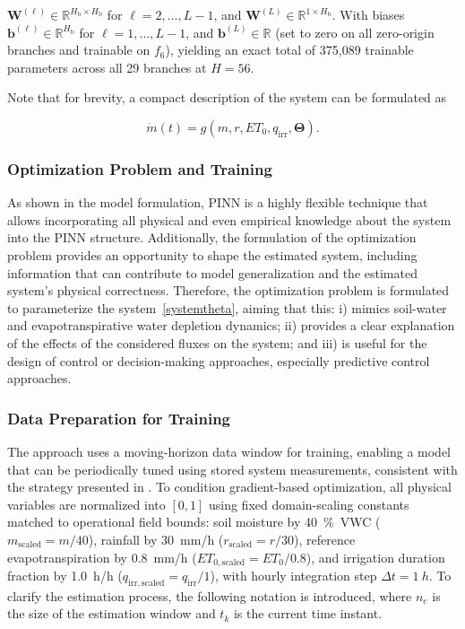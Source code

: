 \documentclass[pdflatex,sn-nature]{sn-jnl}%
\theoremstyle{thmstyleone}%
\theoremstyle{thmstyletwo}%
\theoremstyle{thmstylethree}%
\begin{document}
\( \mathbf{W}^{(\ell)} \in \mathbb{R}^{H_{\mathrm{b}} \times H_{\mathrm{b}}} \) for \( \ell = 2, \dots, L-1 \), and \( \mathbf{W}^{(L)} \in \mathbb{R}^{1 \times H_{\mathrm{b}}} \). With biases \( \mathbf{b}^{(\ell)} \in \mathbb{R}^{H_{\mathrm{b}}} \) for \( \ell = 1, \dots, L-1 \), and \( \mathbf{b}^{(L)} \in \mathbb{R} \) (set to zero on all zero-origin branches and trainable on \(f_6\)), yielding an exact total of 375,089 trainable parameters across all 29 branches at \(H=56\).

Note that for brevity, a compact description of the system can be formulated as 

\begin{equation}
    \label{systemtheta}
    \dot{m}(t) = g(m,r,ET_0,q_{\mathrm{irr}},\boldsymbol{\Theta}).
\end{equation}


\subsubsection{Optimization Problem and Training}\label{subsec2}

As shown in the model formulation, PINN is a highly flexible technique that allows incorporating all physical and even empirical knowledge about the system into the PINN structure. Additionally, the formulation of the optimization problem provides an opportunity to shape the estimated system, including information that can contribute to model generalization and the estimated system's physical correctness. Therefore, the optimization problem is formulated to parameterize the system~\eqref{systemtheta}, aiming that this: i) mimics soil-water and evapotranspirative water depletion dynamics; ii) provides a clear explanation of the effects of the considered fluxes on the system; and iii) is useful for the design of control or decision-making approaches, especially predictive control approaches.

\subsubsection{Data Preparation for Training}

The approach uses a moving-horizon data window for training, enabling a model that can be periodically tuned using stored system measurements, consistent with the strategy presented in \cite{condeforecast2024, Alessandri2017}. To condition gradient-based optimization, all physical variables are normalized into \([0, 1]\) using fixed domain-scaling constants matched to operational field bounds: soil moisture by \SI{40}{\%VWC} (\(m_{\mathrm{scaled}} = m / 40\)), rainfall by \SI{30}{mm/h} (\(r_{\mathrm{scaled}} = r / 30\)), reference evapotranspiration by \SI{0.8}{mm/h} (\(ET_{0,\mathrm{scaled}} = ET_0 / 0.8\)), and irrigation duration fraction by \SI{1.0}{h/h} (\(q_{\mathrm{irr,scaled}} = q_{\mathrm{irr}} / 1\)), with hourly integration step \(\Delta t = \SI{1}{h}\). To clarify the estimation process, the following notation is introduced, where \( n_e \) is the size of the estimation window and \( t_k \) is the current time instant.
\end{document}
